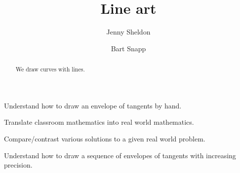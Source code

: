 \documentclass[noauthor,nooutcomes,hints]{ximera}
\author{Jenny Sheldon \and Bart Snapp}
\title{Line art}
\begin{document}
\begin{abstract}
  We draw curves with lines.
\end{abstract}
\maketitle

\begin{listOutcomes}
\item Understand how to draw an envelope of tangents by hand.
\item Translate classroom mathematics into real world mathematics.
\item Compare/contrast various solutions to a given real world
  problem.
\item Understand how to draw a sequence of envelopes of tangents with
  increasing precision.
\end{listOutcomes}
\end{document}

